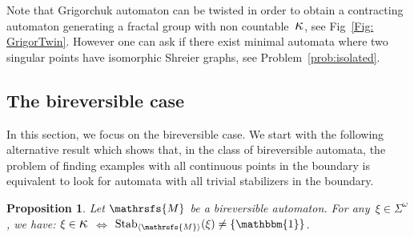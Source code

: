 \documentclass{amsart}
\newtheorem{proposition}[theorem]{Proposition}
\begin{document}
Note that Grigorchuk automaton can be twisted in order to obtain a contracting automaton generating a fractal group with non countable~${\hbox{\Large{$\kappa$}}}$, see Fig~\ref{Fig: GrigorTwin}. However one can ask if there exist minimal automata where two singular points have isomorphic Shreier graphs, see Problem~\ref{prob:isolated}.
\subsection{The bireversible case}
In this section, we focus on the bireversible case. We start with the following alternative result which shows that, in the class of bireversible automata, the problem of finding examples with all continuous points in the boundary is equivalent to look for automata with all trivial stabilizers in the boundary. 

\begin{proposition}\label{prop: discontinuous point birev}
Let ${{{\mathrsfs{{M}}}}}$ be a bireversible automaton. For any~$\xi\in {{{\Sigma}}}^{\omega}$, we have: $\xi \in {\hbox{\Large{$\kappa$}}}$ $\Leftrightarrow$ $\operatorname{Stab}_{{{\langle}{{\mathrsfs{{{M}}}}}{\rangle}}}(\xi) \neq \{\operatorname{\mathbbm{1}}\}$.
\end{proposition}
\end{document}
